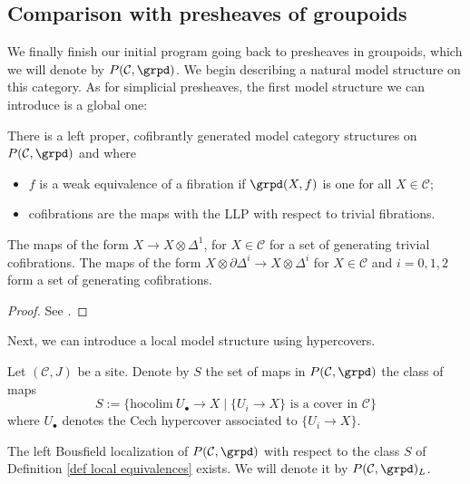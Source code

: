 \subsection{Comparison with presheaves of groupoids}

We finally finish our initial program going back to presheaves in groupoids, which we will denote by $P(\mathcal C,\grpd)$. We begin describing a natural model structure on this category. As for simplicial presheaves, the first model structure we can introduce is a global one:

\begin{thm} \label{thm model structure on presheaves of groupoids}
There is a left proper, cofibrantly generated model category structures on $P(\mathcal C, \grpd)$ and where
\begin{itemize}
\item $f$ is a weak equivalence of a fibration if $\grpd(X,f)$ is one for all $X \in \mathcal C$;
\item cofibrations are the maps with the LLP with respect to trivial fibrations.
\end{itemize}
The maps of the form $X \to X \otimes \Delta^1$, for $X \in \mathcal C$ for a set of generating trivial cofibrations. The maps of the form $X \otimes \partial \Delta^i \to X \otimes \Delta^i$ for $X \in \mathcal C$ and $i = 0,1,2$ form a set of generating cofibrations.
\end{thm}

\begin{proof}
See .
\end{proof}

Next, we can introduce a local model structure using hypercovers.

\begin{defin} \label{def local equivalences}
Let $(\mathcal C,J)$ be a site. Denote by $S$ the set of maps in $P(\mathcal C, \grpd)$ the class of maps
\[
S := \{\mathrm{hocolim} \: U_\bullet \to X \mid \{U_i \to X\} \text{ is a cover in } \mathcal C\} 
\]
where $U_\bullet$ denotes the Cech hypercover associated to $\{U_i \to X\}$.
\end{defin}

\begin{prop}
The left Bousfield localization of $P(\mathcal C, \grpd)$ with respect to the class $S$ of Definition \ref{def local equivalences} exists. We will denote it by $P(\mathcal C,\grpd)_L$.
\end{prop}

